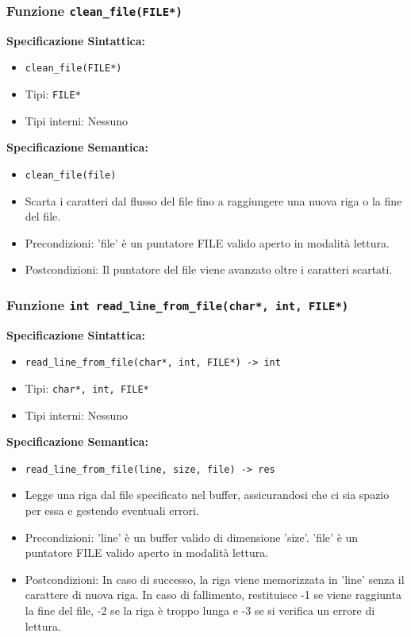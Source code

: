 \documentclass[11pt]{scrartcl} %
\begin{document}
\subsubsection{Funzione \texttt{clean\_file(FILE*)}}

\textbf{Specificazione Sintattica:}
\begin{itemize}
	\item \texttt{clean\_file(FILE*)}
	\item Tipi: \texttt{FILE*}
	\item Tipi interni: Nessuno
\end{itemize}

\textbf{Specificazione Semantica:}
\begin{itemize}
	\item \texttt{clean\_file(file)}
	\item Scarta i caratteri dal flusso del file fino a raggiungere una nuova riga o la fine del file.
	\item Precondizioni: 'file' è un puntatore FILE valido aperto in modalità lettura.
	\item Postcondizioni: Il puntatore del file viene avanzato oltre i caratteri scartati.
\end{itemize}

\subsubsection{Funzione \texttt{int read\_line\_from\_file(char*, int, FILE*)}}

\textbf{Specificazione Sintattica:}
\begin{itemize}
	\item \texttt{read\_line\_from\_file(char*, int, FILE*) -> int}
	\item Tipi: \texttt{char*, int, FILE*}
	\item Tipi interni: Nessuno
\end{itemize}

\textbf{Specificazione Semantica:}
\begin{itemize}
	\item \texttt{read\_line\_from\_file(line, size, file) -> res}
	\item  Legge una riga dal file specificato nel buffer, assicurandosi che ci sia spazio per essa e  gestendo eventuali errori.
	\item Precondizioni: 'line' è un buffer valido di dimensione 'size'. 'file' è un puntatore FILE valido aperto in modalità lettura.
	\item Postcondizioni: In caso di successo, la riga viene memorizzata in 'line' senza il carattere di nuova riga. In caso di fallimento, restituisce -1 se viene raggiunta la fine del file, -2 se la riga è troppo lunga e -3 se si verifica un errore di lettura.
\end{itemize}
\end{document}
